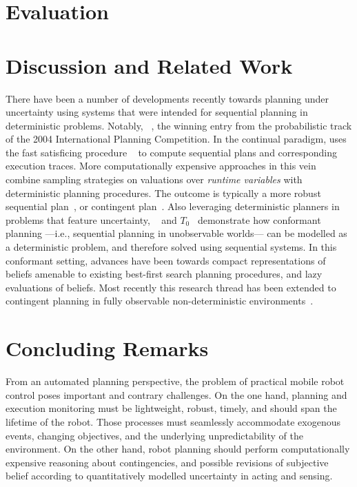 \documentclass[letterpaper]{article}
\begin{document}
\section{Evaluation}


\section{Discussion and Related Work}

There have been a number of developments recently towards planning
under uncertainty using systems that were intended for sequential
planning in deterministic problems.  Notably,
~\cite{yoon:etal:2007}, the winning entry from the
probabilistic track of the 2004 International Planning Competition.
In the continual paradigm,  uses the fast satisficing
procedure ~\cite{hoffmann:nebel:2001} to compute sequential
plans and corresponding execution traces.
More computationally expensive approaches in this vein combine
sampling strategies on valuations over {\em runtime variables} with
deterministic planning procedures. The outcome is typically a more
robust sequential plan~\cite{yoon:etal:2008}, or contingent
plan~\cite{majercik:2006}.
Also leveraging deterministic planners in problems that feature
uncertainty, ~\cite{hoffmann:brafman:2006} and
$T_0$~\cite{palacios:geffner:2009} demonstrate how conformant planning
---i.e., sequential planning in unobservable worlds--- can be modelled
as a deterministic problem, and therefore solved using sequential
systems. In this conformant setting, advances have been towards
compact representations of beliefs amenable to existing best-first
search planning procedures, and lazy evaluations of beliefs. Most
recently this research thread has been extended to contingent planning
in fully observable non-deterministic
environments~\cite{albore:etal:2009}.

\section{Concluding Remarks}

From an automated planning perspective, the problem of practical
mobile robot control poses important and contrary challenges.
On the one hand, planning and execution monitoring must be
lightweight, robust, timely, and should span the lifetime of the
robot. Those processes must seamlessly accommodate exogenous events,
changing objectives, and the underlying unpredictability of the
environment.
On the other hand, robot planning should perform computationally
expensive reasoning about contingencies, and possible revisions of
subjective belief according to quantitatively modelled uncertainty in
acting and sensing. 
\end{document}
